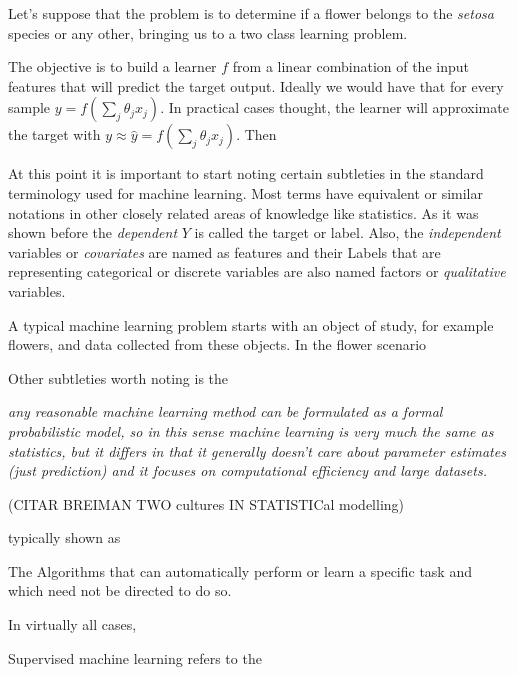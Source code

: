 Let's suppose that the problem is to determine if a flower belongs to the \textit{setosa} species or any other, bringing us to a two class learning problem.
 
The objective is to build a learner $f$ from a linear combination of the input features that will predict the target output. Ideally we would have that for every sample $y =  f(\sum_{j}\theta_jx_j)$. In practical cases thought, the learner will approximate the target with $y \approx \hat{y} = f(\sum_{j}\theta_jx_j)$. Then 

At this point it is important to start noting certain subtleties in the standard terminology used for machine learning. Most terms have equivalent or similar notations in other closely related areas of knowledge like statistics. As it was shown before the \textit{dependent} $Y$ is called the target or label. Also, the \textit{independent} variables or \textit{covariates} are named as features and their 
Labels that are representing categorical or discrete variables are also named factors or \textit{qualitative} variables. 



A typical machine learning problem starts with an object of study, for example flowers, and data collected from these objects. In the flower scenario 

Other subtleties worth noting is the 

\textit{any reasonable machine learning method can be formulated as a formal probabilistic model, so in this sense machine learning is very much the same as statistics, but it differs in that it generally doesn't care about parameter estimates (just prediction) and it focuses on computational efficiency and large datasets.}

(CITAR BREIMAN TWO cultures IN STATISTICal modelling)

typically shown as 





The 
Algorithms that can automatically perform or learn a specific task and which need not be directed to do so. 



In virtually all cases, 

Supervised machine learning refers to the 


\subsection{}
